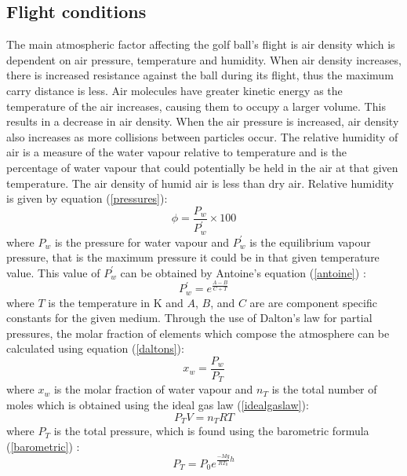 \documentclass[12pt]{article}
\begin{document}
\subsection{Flight conditions}
The main atmospheric factor affecting the golf ball’s flight is air density which is dependent on air pressure, temperature and humidity. When air density increases, there is increased resistance against the ball during its flight, thus the maximum carry distance is less. Air molecules have greater kinetic energy as the temperature of the air increases, causing them to occupy a larger volume. This results in a decrease in air density. When the air pressure is increased, air density also increases as more collisions between particles occur. The relative humidity of air is a measure of the water vapour relative to temperature and is the percentage of water vapour that could potentially be held in the air at that given temperature.  The air density of humid air is less than dry air. Relative humidity is given by equation (\ref{pressures}):
\begin{equation} \label{pressures}
\phi = \frac{P_w}{P_{w}^\prime} \times 100
\end{equation}
where $P_w$ is the pressure for water vapour and $P_{w}^\prime$ is the equilibrium vapour pressure, that is the maximum pressure it could be in that given temperature value. This value of $P_{w}^\prime$ can be obtained by Antoine's equation (\ref{antoine}) \cite{Roizard2014}:
\begin{equation} \label{antoine}
P_{w}^\prime = e^{\frac{A-B}{C+T}}
\end{equation}
where $T$ is the temperature in K and $A$, $B$, and $C$ are are component specific constants for the given medium. Through the use of Dalton's law for partial pressures, the molar fraction of elements which compose the atmosphere can be calculated using equation (\ref{daltons}):
\begin{equation} \label{daltons}
x_w = \frac{P_w}{P_T}
\end{equation}
where $x_w$ is the molar fraction of water vapour and $n_T$ is the total number of moles which is obtained using the ideal gas law (\ref{idealgaslaw}):
\begin{equation} \label{idealgaslaw}
P_T V = n_T R T
\end{equation}
where $P_T$ is the total pressure, which is found using the barometric formula (\ref{barometric}) \cite{BerberanSantos1997}:
\begin{equation} \label{barometric}
P_T = P_0 e^{\frac{-Mg}{R T_0} h}
\end{equation}
\end{document}
